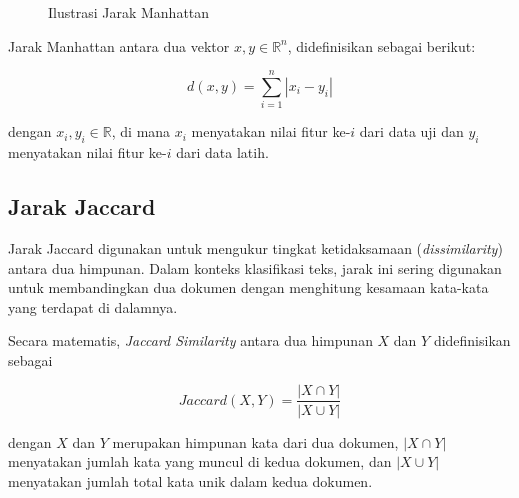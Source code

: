 \documentclass[a4paper,12pt]{report}
\numberwithin{equation}{chapter}
\begin{document}
\begin{figure}[h]
\centering
{}
\caption{Ilustrasi Jarak Manhattan}
\label{fig:manhattan}
\end{figure}

Jarak Manhattan antara dua vektor $x, y \in \mathbb{R}^n$, didefinisikan sebagai berikut:

\begin{equation}
d(x, y) = \sum_{i=1}^{n} |x_i - y_i|
\label{eq:manhattan}
\end{equation}

dengan $x_i, y_i \in \mathbb{R}$, di mana $x_i$ menyatakan nilai fitur ke-$i$ dari data uji dan $y_i$ menyatakan nilai fitur ke-$i$ dari data latih.


\subsection{Jarak Jaccard}
\label{subsec:jaccard}
Jarak Jaccard digunakan untuk mengukur tingkat ketidaksamaan (\textit{dissimilarity}) antara dua himpunan. Dalam konteks klasifikasi teks, jarak ini sering digunakan untuk membandingkan dua dokumen dengan menghitung kesamaan kata-kata yang terdapat di dalamnya. 

Secara matematis, \textit{Jaccard Similarity} antara dua himpunan $X$ dan $Y$ didefinisikan sebagai 

\begin{equation}
    Jaccard(X, Y) = \frac{|X \cap Y|}{|X \cup Y|}
    \label{eq:jaccardsim}
\end{equation}

dengan $X$ dan $Y$ merupakan himpunan kata dari dua dokumen, $|X \cap Y|$ menyatakan jumlah kata yang muncul di kedua dokumen, dan $|X \cup Y|$ menyatakan jumlah total kata unik dalam kedua dokumen.
\end{document}

